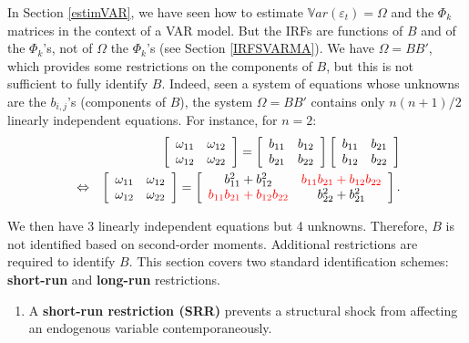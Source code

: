 \documentclass[
  11pt,
]{book}
\providecommand{\tightlist}{%
  \setlength{\itemsep}{0pt}\setlength{\parskip}{0pt}}
\theoremstyle{definition}
\theoremstyle{definition}
\theoremstyle{definition}
\theoremstyle{definition}
\theoremstyle{remark}
\begin{document}
In Section \ref{estimVAR}, we have seen how to estimate \(\mathbb{V}ar(\varepsilon_t) =\Omega\) and the \(\Phi_k\) matrices in the context of a VAR model. But the IRFs are functions of \(B\) and of the \(\Phi_k\)'s, not of \(\Omega\) the \(\Phi_k\)'s (see Section \ref{IRFSVARMA}). We have \(\Omega = BB'\), which provides some restrictions on the components of \(B\), but this is not sufficient to fully identify \(B\). Indeed, seen a system of equations whose unknowns are the \(b_{i,j}\)'s (components of \(B\)), the system \(\Omega = BB'\) contains only \(n(n+1)/2\) linearly independent equations. For instance, for \(n=2\):
\begin{eqnarray*}
&&\left[
\begin{array}{cc}
\omega_{11} & \omega_{12} \\
\omega_{12} & \omega_{22}
\end{array}
\right] = \left[
\begin{array}{cc}
b_{11} & b_{12} \\
b_{21} & b_{22}
\end{array}
\right]\left[
\begin{array}{cc}
b_{11} & b_{21} \\
b_{12} & b_{22}
\end{array}
\right]\\
&\Leftrightarrow&\left[
\begin{array}{cc}
\omega_{11} & \omega_{12} \\
\omega_{12} & \omega_{22}
\end{array}
\right] = \left[
\begin{array}{cc}
b_{11}^2+b_{12}^2 & {\color{red}b_{11}b_{21}+b_{12}b_{22}} \\
{\color{red}b_{11}b_{21}+b_{12}b_{22}} & b_{22}^2 + b_{21}^2
\end{array}
\right].
\end{eqnarray*}

We then have 3 linearly independent equations but 4 unknowns. Therefore, \(B\) is not identified based on second-order moments. Additional restrictions are required to identify \(B\). This section covers two standard identification schemes: \textbf{short-run} and \textbf{long-run} restrictions.

\begin{enumerate}
\def\labelenumi{\arabic{enumi}.}
\tightlist
\item
  A \textbf{short-run restriction (SRR)} prevents a structural shock from affecting an endogenous variable contemporaneously.
\end{enumerate}
\end{document}
